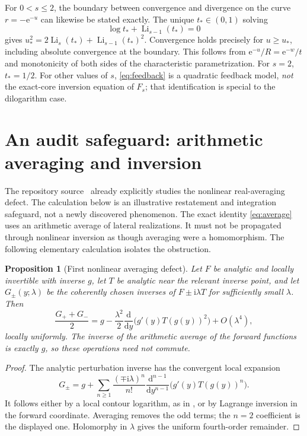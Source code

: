 \documentclass[11pt,a4paper]{article}
\newtheorem{proposition}[theorem]{Proposition}
\theoremstyle{definition}\newtheorem{definition}[theorem]{Definition}
\theoremstyle{remark}\newtheorem{remark}[theorem]{Remark}
\newcommand{\Li}{\operatorname{Li}}
\newcommand{\ii}{\mathrm i}
\newcommand{\ee}{\mathrm e}
\numberwithin{equation}{section}
\begin{document}
For $0<s\le2$, the boundary between convergence and divergence on the
curve $r=-\ee^{-u}$ can likewise be stated exactly. The unique
$t_*\in(0,1)$ solving
\begin{equation}\label{eq:general-physical}
 \log t_*+\Li_{s-1}(t_*)=0
\end{equation}
gives $u_*^2=2\Li_s(t_*)+\Li_{s-1}(t_*)^2$.
Convergence holds precisely for $u\ge u_*$, including absolute convergence
at the boundary. This follows from $\ee^{-u}/R=\ee^{-w}/t$ and monotonicity
of both sides of the characteristic parametrization. For $s=2$,
$t_*=1/2$. For other values of $s$, \eqref{eq:feedback} is a quadratic
feedback model, \emph{not} the exact-core inversion equation of $F_s$;
that identification is special to the dilogarithm case.

\section{An audit safeguard: arithmetic averaging and inversion}\label{sec:averaging}

The repository source~\cite{RepoTransport} already explicitly studies the
nonlinear real-averaging defect. The calculation below is an illustrative
restatement and integration safeguard, not a newly discovered phenomenon.
The exact identity \eqref{eq:average} uses an arithmetic average of
lateral realizations. It must not be propagated through nonlinear
inversion as though averaging were a homomorphism. The following elementary
calculation isolates the obstruction.

\begin{proposition}[First nonlinear averaging defect]\label{prop:average-defect}
Let $F$ be analytic and locally invertible with inverse $g$, let $T$ be
analytic near the relevant inverse point, and let $G_\pm(y;\lambda)$ be the
coherently chosen inverses of $F\pm\ii\lambda T$ for sufficiently small
$\lambda$. Then
\begin{equation}\label{eq:averaging-defect}
 \frac{G_++G_-}{2}
   =g-\frac{\lambda^2}{2}\frac{\mathrm d}{\mathrm dy}
               \bigl(g'(y)T(g(y))^2\bigr)+O(\lambda^4),
\end{equation}
locally uniformly. The inverse of the arithmetic average of the forward
functions is exactly $g$, so these operations need not commute.
\end{proposition}
\begin{proof}
The analytic perturbation inverse has the convergent local expansion
\[
 G_\pm=g+\sum_{n\ge1}\frac{(\mp\ii\lambda)^n}{n!}
             \frac{\mathrm d^{n-1}}{\mathrm dy^{n-1}}
               \bigl(g'(y)T(g(y))^n\bigr).
\]
It follows either by a local contour logarithm, as in
\cite{RepoTransport}, or by Lagrange inversion in the forward coordinate.
Averaging removes the odd terms; the $n=2$ coefficient is the displayed
one. Holomorphy in $\lambda$ gives the uniform fourth-order remainder.
\end{proof}
\end{document}
